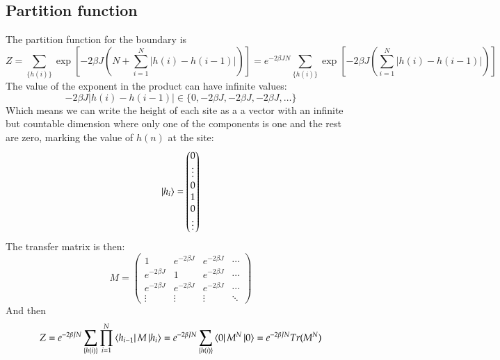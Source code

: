 \documentclass{article}
\begin{document}
\subsection{Partition function}
The partition function for the boundary is
\begin{equation}
    Z = \sum_{\{h(i)\}} \exp[-2\beta J \left(
        N + \sum_{i=1}^{N}|h(i) - h(i-1)|
    \right)] = e^{-2\beta JN} \sum_{\{h(i)\}} \exp[-2\beta J \left(
        \sum_{i=1}^{N}|h(i) - h(i-1)|
    \right)]
\end{equation}
The value of the exponent in the product can have infinite values:
\begin{equation}
    -2\beta J |h(i) - h(i-1)| \in \{
        0, -2\beta J, -2\beta J, -2 \beta J, \dots
    \}
\end{equation}
Which means we can write the height of each site as a a vector with an infinite but countable dimension where only one of the components is one and the rest are zero, marking the value of $h(n)$ at the site:
\begin{equation}
    \ket{h_i} = \begin{pmatrix}
        0 \\ \vdots \\ 0 \\ 1 \\ 0 \\ \vdots
    \end{pmatrix}
\end{equation}
The transfer matrix is then:
\begin{equation}
    M = \begin{pmatrix}
        1 & e^{-2 \beta J} & e^{-2 \beta J} & \cdots \\ 
        e^{-2 \beta J} & 1 & e^{-2 \beta J} & \cdots \\
        e^{-2 \beta J} & e^{-2 \beta J} & e^{-2 \beta J} & \cdots \\
        \vdots & \vdots & \vdots & \ddots
    \end{pmatrix}
\end{equation}
And then
\begin{equation}
    Z = e^{-2\beta JN} \sum_{\{h(i)\}} \prod_{i=1}^{N} \bra{h_{i-1}}M\ket{h_i} = e^{-2\beta JN} \sum_{\{h(i)\}} \bra{0}M^N\ket{0} = e^{-2\beta JN} Tr(M^N)
\end{equation}
\end{document}
